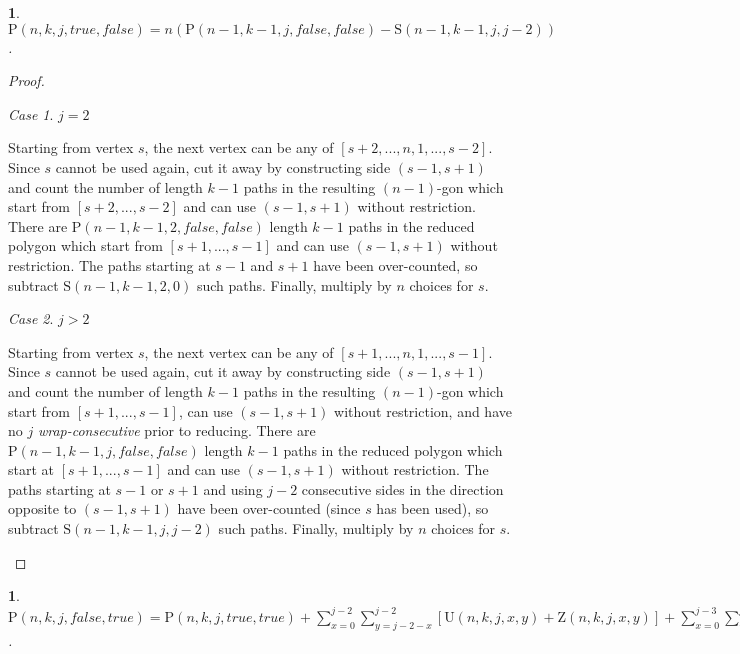\documentclass[a4paper, 12pt] {article}
\theoremstyle{remark}
\theoremstyle{plain}
\newcommand{\thistheoremname}{}
\newtheorem{genericthm}[theorem]{\thistheoremname}
\newenvironment{namedthm}[1]
  {\renewcommand{\thistheoremname}{#1}
   \begin{genericthm}}
  {\end{genericthm}}
\theoremstyle{remark}
\newtheorem{case}{Case}
\begin{document}
\begin{namedthm}{Restricted Wrap-Consecutivity Theorem}
\label{restricted_wrap-consecutivity}
$\mathrm{P}(n,k,j,true,false)=n(\mathrm{P}(n-1,k-1,j,false,false)-\mathrm{S}(n-1,k-1,j,j-2))$.
\end{namedthm}

\begin{proof}

\begin{case} $j=2$

Starting from vertex $s$, the next vertex can be any of $[s+2,...,n,1,...,s-2]$. Since $s$ cannot be used again, cut it away by constructing side $(s-1,s+1)$ and count the number of length $k-1$ paths in the resulting $(n-1)$-gon which start from $[s+2,...,s-2]$ and can use $(s-1,s+1)$ without restriction. There are $\mathrm{P}(n-1,k-1,2,false,false)$ length $k-1$ paths in the reduced polygon which start from $[s+1,...,s-1]$ and can use $(s-1,s+1)$ without restriction. The paths starting at $s-1$ and $s+1$ have been over-counted, so subtract $\mathrm{S}(n-1,k-1,2,0)$ such paths. Finally, multiply by $n$ choices for $s$.
\end{case}

\begin{case} $j>2$

Starting from vertex $s$, the next vertex can be any of $[s+1,...,n,1,...,s-1]$. Since $s$ cannot be used again, cut it away by constructing side $(s-1,s+1)$ and count the number of length $k-1$ paths in the resulting $(n-1)$-gon which start from $[s+1,...,s-1]$, can use $(s-1,s+1)$ without restriction, and have no $j$ \textit{wrap-consecutive} prior to reducing. There are $\mathrm{P}(n-1,k-1,j,false,false)$ length $k-1$ paths in the reduced polygon which start at $[s+1,...,s-1]$ and can use $(s-1,s+1)$ without restriction. The paths starting at $s-1$ or $s+1$ and using $j-2$ consecutive sides in the direction opposite to $(s-1,s+1)$ have been over-counted (since $s$ has been used), so subtract $\mathrm{S}(n-1,k-1,j,j-2)$ such paths. Finally, multiply by $n$ choices for $s$.
\end{case}

\end{proof}


\begin{namedthm}{Restricted Cyclic-Consecutivity Theorem}
\label{restricted_cyclic-consecutivity}
$\mathrm{P}(n,k,j,false,true) \allowbreak =\mathrm{P}(n,k,j,true,true)+\sum_{x=0}^{j-2} \sum_{y=j-2-x}^{j-2} [\mathrm{U}(n,k,j,x,y)+\mathrm{Z}(n,k,j,x,y)]+\sum_{x=0}^{j-3} \allowbreak \sum_{y=0}^{j-3-x} [\sum_{d=j-x-y-2}^{j-2-x} \mathrm{Z}(n-x-y,k-x-y,j,0,d)+\sum_{d=j-x-y-2}^{j-2-y} \mathrm{Z}(n-x-y,k-x-y,j,0,d)]$.
\end{namedthm}
\end{document}
